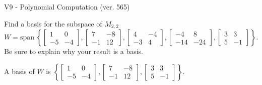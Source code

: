 \begin{exercise}
  \begin{exerciseTitle}V9 - Polynomial Computation (ver. 565)\end{exerciseTitle}
  \begin{exerciseStatement}
    Find a basis for the subspace of \(M_{2,2}\) 
\[W=\mathrm{span}\ \left\{\left[\begin{array}{cc}
1 & 0 \\
-5 & -4
\end{array}\right] , \left[\begin{array}{cc}
7 & -8 \\
-1 & 12
\end{array}\right] , \left[\begin{array}{cc}
4 & -4 \\
-3 & 4
\end{array}\right] , \left[\begin{array}{cc}
-4 & 8 \\
-14 & -24
\end{array}\right] , \left[\begin{array}{cc}
3 & 3 \\
5 & -1
\end{array}\right]\right\}.\]
 Be sure to explain why your result is a basis.


  \end{exerciseStatement}
  \begin{exerciseAnswer}
   A basis of \(W\) is  \(\left\{\left[\begin{array}{cc}
1 & 0 \\
-5 & -4
\end{array}\right] , \left[\begin{array}{cc}
7 & -8 \\
-1 & 12
\end{array}\right] , \left[\begin{array}{cc}
3 & 3 \\
5 & -1
\end{array}\right]\right\}\).
  


  \end{exerciseAnswer}
\end{exercise}